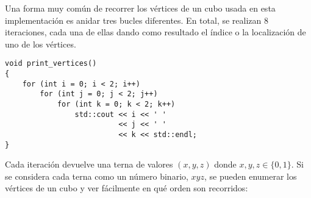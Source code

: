 Una forma muy común de recorrer los vértices de un cubo usada en esta implementación es anidar tres bucles diferentes. En total, se realizan 8 iteraciones, cada una de ellas dando como resultado el índice o la localización de uno de los vértices.

\begin{lstlisting}[basicstyle=\footnotesize]
void print_vertices()
{
    for (int i = 0; i < 2; i++)
        for (int j = 0; j < 2; j++)
            for (int k = 0; k < 2; k++)
                std::cout << i << ' '
                          << j << ' '
                          << k << std::endl;
}
\end{lstlisting}

Cada iteración devuelve una terna de valores $(x,y,z)$ donde $x,y,z\in\{0,1\}$. Si se considera cada terna como un número binario, $xyz$, se pueden enumerar los vértices de un cubo y ver fácilmente en qué orden son recorridos:

